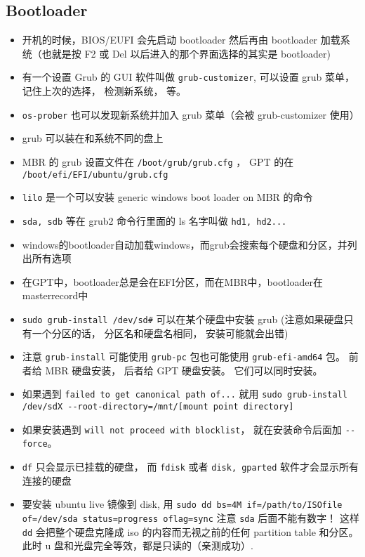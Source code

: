 \subsection{Bootloader}
\begin{itemize}
\item 开机的时候，BIOS/EUFI 会先启动 bootloader 然后再由 bootloader 加载系统（也就是按 F2 或 Del 以后进入的那个界面选择的其实是 bootloader)
\item 有一个设置 Grub 的 GUI 软件叫做 \verb|grub-customizer|, 可以设置 grub 菜单， 记住上次的选择， 检测新系统， 等。
\item \verb|os-prober| 也可以发现新系统并加入 grub 菜单（会被 grub-customizer 使用）
\item grub 可以装在和系统不同的盘上
\item MBR 的 grub 设置文件在 \verb|/boot/grub/grub.cfg| ， GPT 的在 \verb|/boot/efi/EFI/ubuntu/grub.cfg|
\item \verb|lilo| 是一个可以安装 generic windows boot loader on MBR 的命令
\item \verb|sda, sdb| 等在 grub2 命令行里面的 ls 名字叫做 \verb|hd1, hd2...|
\item windows的bootloader自动加载windows，而grub会搜索每个硬盘和分区，并列出所有选项
\item 在GPT中，bootloader总是会在EFI分区，而在MBR中，bootloader在masterrecord中
\item \verb|sudo grub-install /dev/sd#| 可以在某个硬盘中安装 grub (注意如果硬盘只有一个分区的话， 分区名和硬盘名相同， 安装可能就会出错)
\item 注意 \verb|grub-install| 可能使用 \verb|grub-pc| 包也可能使用 \verb|grub-efi-amd64| 包。 前者给 MBR 硬盘安装， 后者给 GPT 硬盘安装。 它们可以同时安装。
\item 如果遇到 \verb|failed to get canonical path of...| 就用 \verb|sudo grub-install /dev/sdX --root-directory=/mnt/[mount point directory]|
\item 如果安装遇到 \verb|will not proceed with blocklist|， 就在安装命令后面加 \verb|--force|。
\item \verb|df| 只会显示已挂载的硬盘， 而 \verb|fdisk| 或者 \verb|disk, gparted| 软件才会显示所有连接的硬盘
\item 要安装 ubuntu live 镜像到 disk, 用 \verb|sudo dd bs=4M if=/path/to/ISOfile of=/dev/sda status=progress oflag=sync| 注意 \verb|sda| 后面不能有数字！ 这样 \verb|dd| 会把整个硬盘克隆成 iso 的内容而无视之前的任何 partition table 和分区。 此时 u 盘和光盘完全等效，都是只读的（亲测成功）.
\end{itemize}

